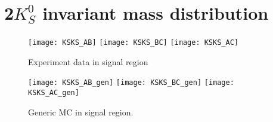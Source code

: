 \chapter{2$K_S^0$ invariant mass distribution}
\begin{figure}[H]
\begin{minipage}[b]{0.45\linewidth}
\centering
\texttt{[image: KSKS\_AB]}
\texttt{[image: KSKS\_BC]}
\texttt{[image: KSKS\_AC]}
\caption{Experiment data in signal region}
\end{minipage}
\begin{minipage}[b]{0.45\linewidth}
\centering
\texttt{[image: KSKS\_AB\_gen]}
\texttt{[image: KSKS\_BC\_gen]}
\texttt{[image: KSKS\_AC\_gen]}
\end{minipage}
\caption{Generic MC in signal region.}
\end{figure}
